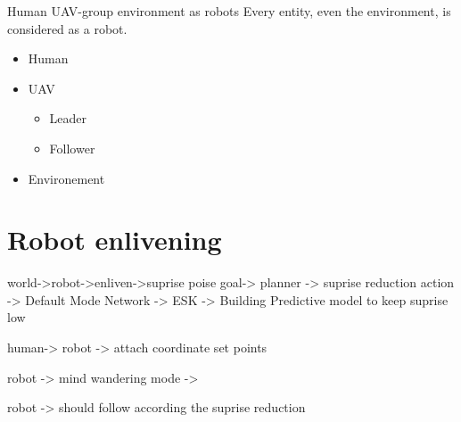 \begin{frame}[allowframebreaks]{Human UAV-group environment as robots}
    Every entity, even the environment, is considered as a robot.
    \begin{itemize}
        \item Human
        \item UAV
        \begin{itemize}
            \item Leader
            \item Follower
        \end{itemize}
        \item Environement
    \end{itemize}
    
    
    \section{Robot enlivening}
        world->robot->enliven->suprise poise goal-> planner -> suprise reduction action -> Default Mode Network -> ESK -> Building Predictive model to keep suprise low
        
        human-> robot -> attach coordinate set points
        
        robot -> mind wandering mode \cite{mason-2007-wandering-minds-the-default-network-and-stimulus-independent-thought} ->
        
        robot -> should follow according the suprise reduction
\end{frame}